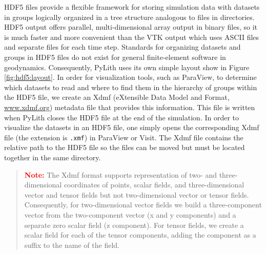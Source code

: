 HDF5 files provide a flexible framework for storing simulation data
with datasets in groups logically organized in a tree structure analogous
to files in directories. HDF5 output offers parallel, multi-dimensional
array output in binary files, so it is much faster and more convenient
than the VTK output which uses ASCII files and separate files for
each time step. Standards for organizing datasets and groups in HDF5
files do not exist for general finite-element software in geodynamics.
Consequently, PyLith uses its own simple layout show in Figure \ref{fig:hdf5:layout}.
In order for visualization tools, such as ParaView, to determine which
datasets to read and where to find them in the hierarchy of groups
within the HDF5 file, we create an Xdmf (eXtensible Data Model and
Format, \url{www.xdmf.org}) metadata file that provides this information.
This file is written when PyLith closes the HDF5 file at the end of
the simulation. In order to visualize the datasets in an HDF5 file,
one simply opens the corresponding Xdmf file (the extension is \texttt{.xmf})
in ParaView or Visit. The Xdmf file contains the relative path to
the HDF5 file so the files can be moved but must be located together
in the same directory. 
\begin{quote}
\textbf{\textcolor{red}{Note:}}\textbf{ }The Xdmf format supports
representation of two- and three-dimensional coordinates of points,
scalar fields, and three-dimensional vector and tensor fields but
not two-dimensional vector or tensor fields. Consequently, for two-dimensional
vector fields we build a three-component vector from the two-component
vector (x and y components) and a separate zero scalar field (z component).
For tensor fields, we create a scalar field for each of the tensor
components, adding the component as a suffix to the name of the field.
\end{quote}
